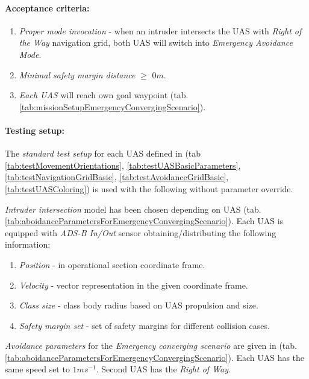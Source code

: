 \paragraph{Acceptance criteria:}
\begin{enumerate}
    \item \emph{Proper mode invocation} - when an intruder intersects the UAS  with \emph{Right of the Way} navigation grid, both UAS will switch into \emph{Emergency Avoidance Mode}.
    
    \item \emph{Minimal safety margin distance} $\ge$ $0 m$.
    
    \item \emph{Each UAS} will reach own goal waypoint (tab. \ref{tab:missionSetupEmergencyConvergingScenario}).
\end{enumerate}

\paragraph{Testing setup:} The \emph{standard test setup} for each UAS defined in (tab \ref{tab:testMovementOrientations}, \ref{tab:testUASBasicParameters}, \ref{tab:testNavigationGridBasic}, \ref{tab:testAvoidanceGridBasic}, \ref{tab:testUASColoring}) is used with the following without parameter override.

\emph{Intruder intersection} model has been chosen depending on UAS (tab. \ref{tab:aboidanceParametersForEmergencyConvergingScenario}). Each UAS is equipped with \emph{ADS-B In/Out} sensor obtaining/distributing the following information:

\begin{enumerate}
    \item \emph{Position} - in operational section coordinate frame.

    \item \emph{Velocity} - vector representation in the given coordinate frame.

    \item \emph{Class size} - class body radius based on UAS propulsion and size.

    \item \emph{Safety margin set} - set of safety margins for different collision cases.
\end{enumerate}

\noindent \emph{Avoidance parameters} for the \emph{Emergency converging scenario} are given in (tab. \ref{tab:aboidanceParametersForEmergencyConvergingScenario}). Each UAS has the same speed set to $1 m s^{-1}$. Second UAS has the \emph{Right of Way}. 

